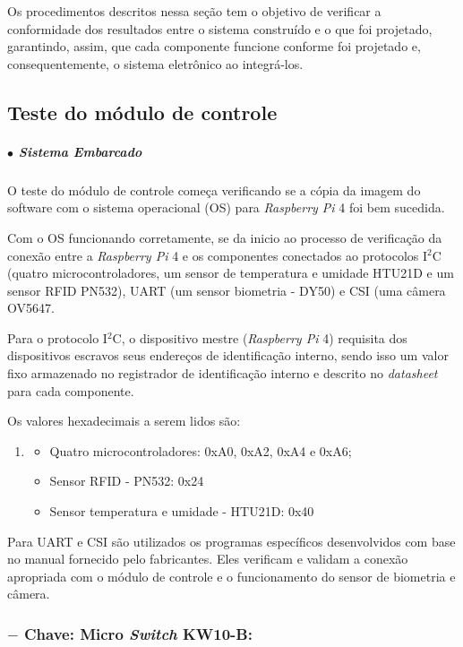 Os procedimentos descritos nessa seção tem o objetivo de verificar a conformidade dos resultados entre o sistema construído e o que foi projetado, garantindo, assim, que cada componente funcione conforme foi projetado e, consequentemente, o sistema eletrônico ao integrá-los. 

\subsection{Teste do módulo de controle}\label{sec:teste_cc}

\subparagraph*{$\bullet$ Sistema Embarcado} \hfill

O teste do módulo de controle começa verificando se a cópia da imagem do software com o sistema operacional (OS) para \textit{Raspberry Pi} 4 foi bem sucedida. 

Com o OS funcionando corretamente, se da inicio ao processo de verificação da conexão entre a \textit{Raspberry Pi} 4 e os componentes conectados ao protocolos I$^2$C (quatro microcontroladores, um sensor de temperatura e umidade HTU21D e um sensor RFID PN532), UART (um sensor biometria - DY50) e CSI (uma câmera OV5647. 

Para o protocolo I$^2$C, o dispositivo mestre (\textit{Raspberry Pi} 4) requisita dos dispositivos escravos seus endereços de identificação interno, sendo isso um valor fixo armazenado no registrador de identificação interno e descrito no \textit{datasheet} para cada componente. 

Os valores hexadecimais a serem lidos são:

\begin{enumerate}
    \item[]
    \begin{itemize}
        \item Quatro microcontroladores: 0xA0, 0xA2, 0xA4 e 0xA6;
        \item Sensor RFID - PN532: 0x24
        \item Sensor temperatura e umidade - HTU21D: 0x40
    \end{itemize}
\end{enumerate}

Para UART e CSI são utilizados os programas específicos desenvolvidos com base no manual fornecido pelo fabricantes. Eles verificam e validam a conexão apropriada com o módulo de controle e o funcionamento do sensor de biometria e câmera.

\subsubsection*{$-$ Chave: Micro \textit{Switch} KW10-B:}

